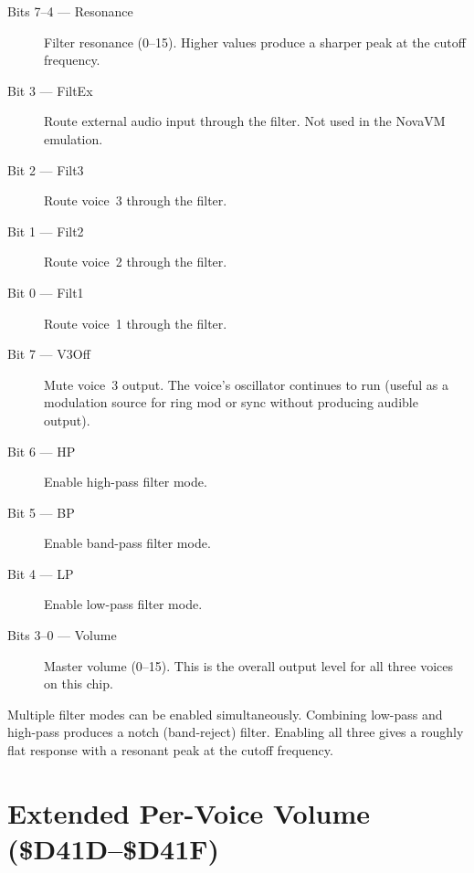 \begin{description}
  \item[Bits 7--4 --- Resonance] Filter resonance (0--15).  Higher values
        produce a sharper peak at the cutoff frequency.
  \item[Bit 3 --- FiltEx] Route external audio input through the filter.
        Not used in the NovaVM emulation.
  \item[Bit 2 --- Filt3] Route voice~3 through the filter.
  \item[Bit 1 --- Filt2] Route voice~2 through the filter.
  \item[Bit 0 --- Filt1] Route voice~1 through the filter.
\end{description}





\begin{description}
  \item[Bit 7 --- V3Off] Mute voice~3 output.  The voice's oscillator
        continues to run (useful as a modulation source for ring mod or sync
        without producing audible output).
  \item[Bit 6 --- HP] Enable high-pass filter mode.
  \item[Bit 5 --- BP] Enable band-pass filter mode.
  \item[Bit 4 --- LP] Enable low-pass filter mode.
  \item[Bits 3--0 --- Volume] Master volume (0--15).  This is the overall
        output level for all three voices on this chip.
\end{description}

\begin{notebox}
Multiple filter modes can be enabled simultaneously.  Combining low-pass and
high-pass produces a notch (band-reject) filter.  Enabling all three gives a
roughly flat response with a resonant peak at the cutoff frequency.
\end{notebox}


\section{Extended Per-Voice Volume (\$D41D--\$D41F)}
\label{sec:sid-ext-volume}

